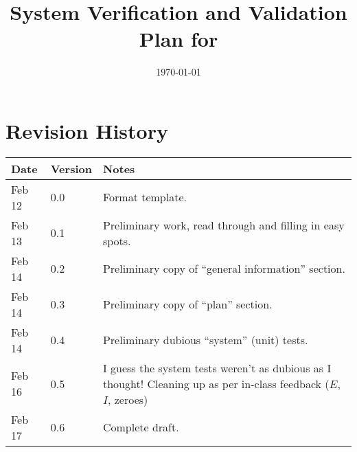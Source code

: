 \documentclass[12pt, titlepage]{article}
\begin{document}

\title{System Verification and Validation Plan for \progname{}}
\author{\authname}
\date{\today}

\maketitle



\section{Revision History}

\begin{tabularx}{\textwidth}{p{3cm}p{2cm}X} \toprule {
    \bf Date} & {\bf Version} & {\bf Notes}                                                                                                       \\
    \midrule
    Feb 12    & 0.0           & Format template.                                                                                                  \\
    Feb 13    & 0.1           & Preliminary work, read through and filling in easy spots.                                                         \\
    Feb 14    & 0.2           & Preliminary copy of ``general information'' section.                                                              \\
    Feb 14    & 0.3           & Preliminary copy of ``plan'' section.                                                                             \\
    Feb 14    & 0.4           & Preliminary dubious ``system'' (unit) tests.                                                                      \\
    Feb 16    & 0.5           & I guess the system tests weren't as dubious as I thought! Cleaning up as per in-class feedback ($E$, $I$, zeroes) \\
    Feb 17    & 0.6           & Complete draft.                                                                                                   \\
    \bottomrule
\end{tabularx}
\end{document}
